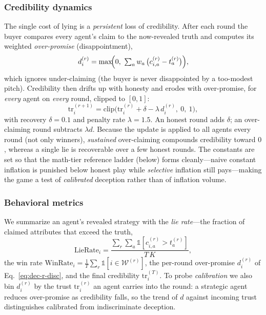 \subsubsection{Credibility dynamics}
The single cost of lying is a \emph{persistent} loss of credibility. After each
round the buyer compares every agent's claim to the now-revealed truth and
computes its weighted \emph{over-promise} (disappointment),
\begin{equation}
d_i^{(r)} = \max\!\Bigl(0,\ \textstyle\sum_{a} w_a\,\bigl(c_{i,a}^{(r)} - t_a^{(r)}\bigr)\Bigr),
\label{eq:dec-r-disc}
\end{equation}
which ignores under-claiming (the buyer is never disappointed by a too-modest
pitch). Credibility then drifts up with honesty and erodes with over-promise,
for \emph{every} agent on \emph{every} round, clipped to $[0,1]$:
\begin{equation}
\mathrm{tr}_i^{(r+1)} = \mathrm{clip}\!\bigl(\mathrm{tr}_i^{(r)} + \delta - \lambda\,d_i^{(r)},\ 0,\ 1\bigr),
\label{eq:dec-r-trust}
\end{equation}
with recovery $\delta=0.1$ and penalty rate $\lambda=1.5$. An honest round adds
$\delta$; an over-claiming round subtracts $\lambda d$. Because the update is
applied to all agents every round (not only winners), \emph{sustained}
over-claiming compounds credibility toward $0$, whereas a single lie is
recoverable over a few honest rounds. The constants are set so that the
math-tier reference ladder (below) forms cleanly---naive constant inflation is
punished below honest play while \emph{selective} inflation still pays---making
the game a test of \emph{calibrated} deception rather than of inflation volume.

\subsubsection{Behavioral metrics}
\label{sec:dec-r-metrics}
We summarize an agent's revealed strategy with the \emph{lie rate}---the fraction
of claimed attributes that exceed the truth,
\begin{equation}
\mathrm{LieRate}_i =
\frac{\sum_r \sum_{a} \mathbb{1}\!\left[c_{i,a}^{(r)} > t_a^{(r)}\right]}{T\,K},
\label{eq:dec-r-lierate}
\end{equation}
the win rate $\mathrm{WinRate}_i = \tfrac{1}{T}\sum_r \mathbb{1}[i \in \mathcal{W}^{(r)}]$,
the per-round over-promise $d_i^{(r)}$ of Eq.~\eqref{eq:dec-r-disc}, and the
final credibility $\mathrm{tr}_i^{(T)}$. To probe \emph{calibration} we also bin
$d_i^{(r)}$ by the trust $\mathrm{tr}_i^{(r)}$ an agent carries into the round: a
strategic agent reduces over-promise as credibility falls, so the trend of
$d$ against incoming trust distinguishes calibrated from indiscriminate
deception.

